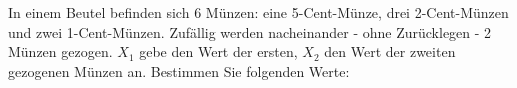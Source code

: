 \documentclass{abgabe}
\begin{document}
\begin{questions}
    \question
    In einem Beutel befinden sich 6 Münzen: eine 5-Cent-Münze, drei 2-Cent-Münzen und zwei 1-Cent-Münzen. 
    Zufällig werden nacheinander - ohne Zurücklegen - 2 Münzen gezogen. 
    $X_1$ gebe den Wert der ersten, $X_2$ den Wert der zweiten gezogenen Münzen an. 
    Bestimmen Sie folgenden Werte:
\end{questions}
\end{document}
